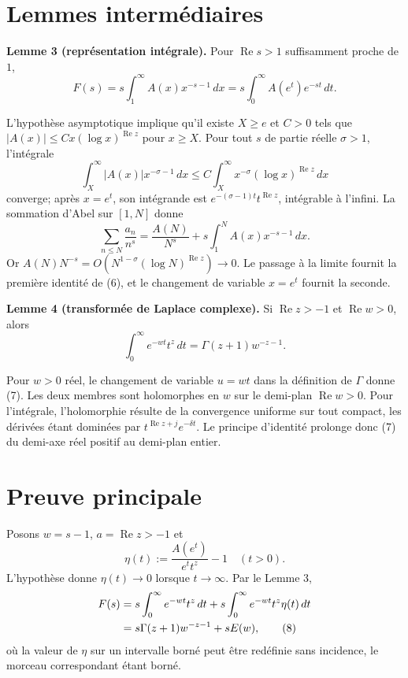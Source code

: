 \documentclass[11pt,a4paper]{article}
\DeclareMathOperator{\re}{Re}
\begin{document}
\section{Lemmes interm\'ediaires}
\begin{lemmabox}
\textbf{Lemme 3 (repr\'esentation int\'egrale).}
Pour $\re s>1$ suffisamment proche de $1$,
\[
 F(s)=s\int_1^\infty A(x)x^{-s-1}\,dx
     =s\int_0^\infty A(e^t)e^{-st}\,dt. \tag{6}
\]
\end{lemmabox}
\begin{proofbox}
L'hypoth\`ese asymptotique implique qu'il existe $X\geq e$ et $C>0$ tels que
$|A(x)|\leq Cx(\log x)^{\re z}$ pour $x\geq X$. Pour tout $s$ de partie
r\'eelle $\sigma>1$, l'int\'egrale
\[
 \int_X^\infty |A(x)|x^{-\sigma-1}\,dx
 \leq C\int_X^\infty x^{-\sigma}(\log x)^{\re z}\,dx
\]
converge; apr\`es $x=e^t$, son int\'egrande est
$e^{-(\sigma-1)t}t^{\re z}$, int\'egrable \`a l'infini. La sommation d'Abel sur
$[1,N]$ donne
\[
 \sum_{n\leq N}\frac{a_n}{n^s}
 =\frac{A(N)}{N^s}+s\int_1^N A(x)x^{-s-1}\,dx.
\]
Or $A(N)N^{-s}=O(N^{1-\sigma}(\log N)^{\re z})\to0$. Le passage \`a la
limite fournit la premi\`ere identit\'e de (6), et le changement de variable
$x=e^t$ fournit la seconde.
\end{proofbox}

\begin{lemmabox}
\textbf{Lemme 4 (transform\'ee de Laplace complexe).}
Si $\re z>-1$ et $\re w>0$, alors
\[
 \int_0^\infty e^{-wt}t^z\,dt=\Gamma(z+1)w^{-z-1}. \tag{7}
\]
\end{lemmabox}
\begin{proofbox}
Pour $w>0$ r\'eel, le changement de variable $u=wt$ dans la d\'efinition de
$\Gamma$ donne (7). Les deux membres sont holomorphes en $w$ sur le demi-plan
$\re w>0$. Pour l'int\'egrale, l'holomorphie r\'esulte de la convergence uniforme
sur tout compact, les d\'eriv\'ees \'etant domin\'ees par
$t^{\re z+j}e^{-\delta t}$. Le principe d'identit\'e prolonge donc (7) du
demi-axe r\'eel positif au demi-plan entier.
\end{proofbox}

\section{Preuve principale}
Posons $w=s-1$, $a=\re z>-1$ et
\[
 \eta(t):=\frac{A(e^t)}{e^t t^z}-1
 \quad(t>0).
\]
L'hypoth\`ese donne $\eta(t)\to0$ lorsque $t\to\infty$. Par le Lemme 3,
\begin{align}
F(s)
&=s\int_0^\infty e^{-wt}t^z\,dt
  +s\int_0^\infty e^{-wt}t^z\eta(t)\,dt \notag\\
&=s\Gamma(z+1)w^{-z-1}+sE(w), \tag{8}
\end{align}
o\`u la valeur de $\eta$ sur un intervalle born\'e peut \^etre red\'efinie sans
incidence, le morceau correspondant \'etant born\'e.
\end{document}
